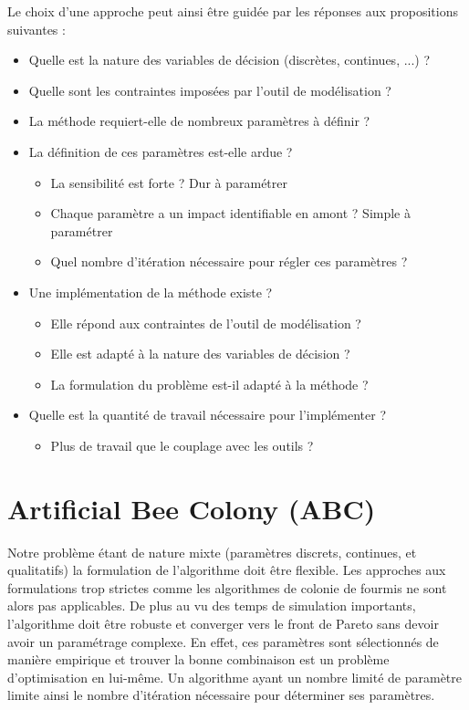 {
\noindent
Le choix d’une approche peut ainsi être guidée par les réponses aux propositions suivantes :
\begin{itemize}
  \item Quelle est la nature des variables de décision (discrètes, continues, ...) ?
  \item Quelle sont les contraintes imposées par l’outil de modélisation ?
  \item La méthode requiert-elle de nombreux paramètres à définir ?
  \item La définition de ces paramètres est-elle ardue ?
    \begin{itemize}
      \item La sensibilité est forte ? Dur à paramétrer
      \item Chaque paramètre a un impact identifiable en amont ? Simple à paramétrer
      \item Quel nombre d’itération nécessaire pour régler ces paramètres ?
    \end{itemize}
  \item Une implémentation de la méthode existe ?
    \begin{itemize}
      \item Elle répond aux contraintes de l’outil de modélisation ?
      \item Elle est adapté à la nature des variables de décision ?
      \item La formulation du problème est-il adapté à la méthode ?
    \end{itemize}
  \item Quelle est la quantité de travail nécessaire pour l’implémenter ?
    \begin{itemize}
      \item Plus de travail que le couplage avec les outils ?
    \end{itemize}
\end{itemize}
}




\section{Artificial Bee Colony (ABC)} %
\label{sec:artificial_bee_colony}
Notre problème étant de nature mixte (paramètres discrets, continues, et qualitatifs)
la formulation de l’algorithme doit être flexible. Les approches aux formulations
trop strictes comme les algorithmes de colonie de fourmis ne sont alors pas applicables.
De plus au vu des temps de simulation importants, l’algorithme doit être robuste
et converger vers le front de Pareto sans devoir avoir un paramétrage complexe.
En effet, ces paramètres sont sélectionnés de manière empirique et trouver la
bonne combinaison est un problème d’optimisation en lui-même. Un algorithme ayant
un nombre limité de paramètre limite ainsi le nombre d’itération nécessaire pour
déterminer ses paramètres.

